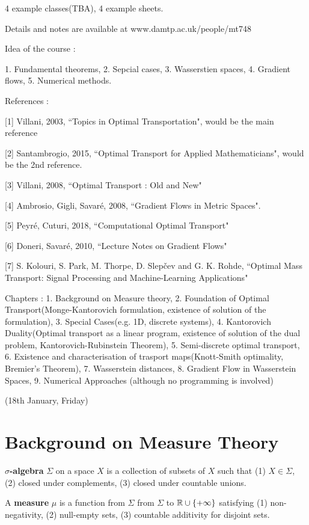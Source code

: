 \documentclass[12pt,a4paper]{article}
\begin{document}
4 example classes(TBA), 4 example sheets.

Details and notes are available at www.damtp.ac.uk/people/mt748
\s

Idea of the course :

1. Fundamental theorems, 2. Sepcial cases, 3. Wasserstien spaces, 4. Gradient flows, 5. Numerical methods.
\s

References :

[1] Villani, 2003, ``Topics in Optimal Transportation", would be the main reference

[2] Santambrogio, 2015, ``Optimal Transport for Applied Mathematicians", would be the 2nd reference.

[3] Villani, 2008, ``Optimal Transport : Old and New"

[4] Ambrosio, Gigli, Savar\'{e}, 2008, ``Gradient Flows in Metric Spaces".

[5] Peyr\'{e}, Cuturi, 2018, ``Computational Optimal Transport"

[6] Doneri, Savar\'{e}, 2010, ``Lecture Notes on Gradient Flows"

[7] S. Kolouri, S. Park, M. Thorpe, D. Slepčev and G. K. Rohde, ``Optimal Mass Transport: Signal Processing and Machine-Learning Applications"
\s

Chapters : 1. Background on Measure theory, 2. Foundation of Optimal Transport(Monge-Kantorovich formulation, existence of solution of the formulation), 3. Special Cases(e.g. 1D, discrete systems), 4. Kantorovich Duality(Optimal transport as a linear program, existence of solution of the dual problem, Kantorovich-Rubinstein Theorem), 5. Semi-discrete optimal transport, 6. Existence and characterisation of trasport maps(Knott-Smith optimality, Bremier's Theorem), 7. Wasserstein distances, 8. Gradient Flow in Wasserstein Spaces, 9. Numerical Approaches (although no programming is involved)

\newday

(18th January, Friday)

\section{Background on Measure Theory}

 \textbf{$\sigma$-algebra} $\Sigma$ on a space $X$ is a collection of subsets of $X$ such that (1) $X\in \Sigma$, (2) closed under complements, (3) closed under countable unions.

\quad A \textbf{measure} $\mu$ is a function from $\Sigma$ from $\Sigma$ to $\mathbb{R} \cup \{+ \infty\}$ satisfying (1) non-negativity, (2) null-empty sets, (3) countable additivity for disjoint sets.
\end{document}
